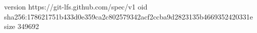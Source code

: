 version https://git-lfs.github.com/spec/v1
oid sha256:178621751b433d0e359ca2c802579342acf2ccba9d2823135b4669352420331e
size 349692
